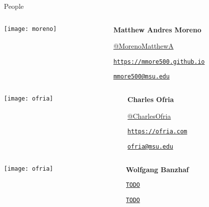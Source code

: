 \begin{frame}{People}

\begin{columns}
\begin{column}{0.25\textwidth}
  \centering
  \texttt{[image: moreno]}
\end{column}
\begin{column}{0.75\textwidth}
  \textbf{Matthew Andres Moreno}

  \href{https://twitter.com/MorenoMatthewA}{{\faTwitter} @MorenoMatthewA}

  \href{https://mmore500.github.io}{{\faGlobe} \texttt{https://mmore500.github.io}}

  \href{mailto: mmore500@msu.edu}{{\faEnvelope} \texttt{mmore500@msu.edu}}

\end{column}
\end{columns}

\vspace{1ex}

\begin{columns}
\begin{column}{0.25\textwidth}
  \centering
  \texttt{[image: ofria]}
\end{column}

\begin{column}{0.75\textwidth}
  \textbf{Charles Ofria}

  \href{https://twitter.com/CharlesOfria}{{\faTwitter} @CharlesOfria}

  \href{https://ofria.com}{{\faGlobe} \texttt{https://ofria.com}}

  \href{mailto: ofria@msu.edu}{{\faEnvelope} \texttt{ofria@msu.edu}}

\end{column}
\end{columns}

\vspace{1ex}

\begin{columns}
\begin{column}{0.25\textwidth}
  \centering
  \texttt{[image: ofria]}%
\end{column}

\begin{column}{0.75\textwidth}
  \textbf{Wolfgang Banzhaf}

  \href{TODO}{{\faGlobe} \texttt{TODO}}

  \href{mailto: TODO}{{\faEnvelope} \texttt{TODO}}

\end{column}
\end{columns}

\end{frame}

